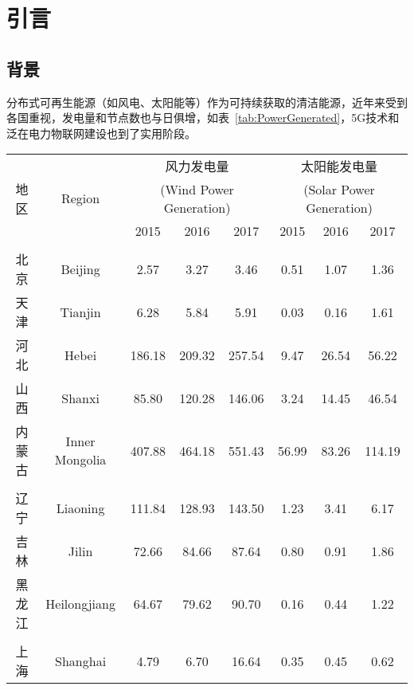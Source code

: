 \chapter{引言}
\label{cha:Intro}

\section{背景}

分布式可再生能源（如风电、太阳能等）作为可持续获取的清洁能源，近年来受到各国重视，发电量和节点数也与日俱增，如表~\ref{tab:PowerGenerated}，5G技术和泛在电力物联网建设也到了实用阶段。

\begin{table}[htbp]
    \centering
    \begin{tabular}{|c|c|c|c|c|c|c|c|}
    \hline
    \multirow{3}{*}{地  区} & \multirow{3}{*}{Region} & \multicolumn{3}{c|}{风力发电量} & \multicolumn{3}{c|}{太阳能发电量} \\ \cline{3-8} 
     &  & \multicolumn{3}{c|}{(Wind Power Generation)} & \multicolumn{3}{c|}{(Solar Power Generation)} \\ \cline{3-8} 
     &  & 2015 & 2016 & 2017 & 2015 & 2016 & 2017 \\ \hline
     &  &  &  &  &  &  &  \\ \hline
    北  京 & Beijing & 2.57 & 3.27 & 3.46 & 0.51 & 1.07 & 1.36 \\ \hline
    天  津 & Tianjin & 6.28 & 5.84 & 5.91 & 0.03 & 0.16 & 1.61 \\ \hline
    河  北 & Hebei & 186.18 & 209.32 & 257.54 & 9.47 & 26.54 & 56.22 \\ \hline
    山  西 & Shanxi & 85.80 & 120.28 & 146.06 & 3.24 & 14.45 & 46.54 \\ \hline
    内蒙古 & Inner Mongolia & 407.88 & 464.18 & 551.43 & 56.99 & 83.26 & 114.19 \\ \hline
     &  &  &  &  &  &  &  \\ \hline
    辽  宁 & Liaoning & 111.84 & 128.93 & 143.50 & 1.23 & 3.41 & 6.17 \\ \hline
    吉  林 & Jilin & 72.66 & 84.66 & 87.64 & 0.80 & 0.91 & 1.86 \\ \hline
    黑龙江 & Heilongjiang & 64.67 & 79.62 & 90.70 & 0.16 & 0.44 & 1.22 \\ \hline
     &  &  &  &  &  &  &  \\ \hline
    上  海 & Shanghai & 4.79 & 6.70 & 16.64 & 0.35 & 0.45 & 0.62 \\ \hline

\end{tabular}
\end{table}
